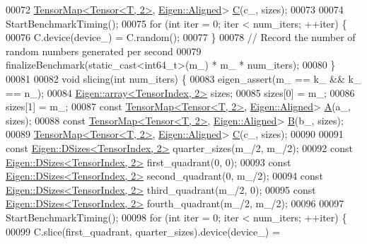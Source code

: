 \begin{DoxyCode}
00072     \hyperlink{class_eigen_1_1_tensor_map}{TensorMap<Tensor<T, 2>}, \hyperlink{group__enums_gga45fe06e29902b7a2773de05ba27b47a1ad37d4c71425bb286e9b4103830538fbf}{Eigen::Aligned}> 
      \hyperlink{group___core___module}{C}(c\_, sizes);
00073 
00074     StartBenchmarkTiming();
00075     \textcolor{keywordflow}{for} (\textcolor{keywordtype}{int} iter = 0; iter < num\_iters; ++iter) \{
00076       C.device(device\_) = C.random();
00077     \}
00078     \textcolor{comment}{// Record the number of random numbers generated per second}
00079     finalizeBenchmark(static\_cast<int64\_t>(m\_) * m\_ * num\_iters);
00080   \}
00081 
00082   \textcolor{keywordtype}{void} slicing(\textcolor{keywordtype}{int} num\_iters) \{
00083     eigen\_assert(m\_ == k\_ && k\_ == n\_);
00084     \hyperlink{class_eigen_1_1array}{Eigen::array<TensorIndex, 2>} sizes;
00085     sizes[0] = m\_;
00086     sizes[1] = m\_;
00087     \textcolor{keyword}{const} \hyperlink{class_eigen_1_1_tensor_map}{TensorMap<Tensor<T, 2>}, \hyperlink{group__enums_gga45fe06e29902b7a2773de05ba27b47a1ad37d4c71425bb286e9b4103830538fbf}{Eigen::Aligned}> 
      \hyperlink{group___core___module_class_eigen_1_1_matrix}{A}(a\_, sizes);
00088     \textcolor{keyword}{const} \hyperlink{class_eigen_1_1_tensor_map}{TensorMap<Tensor<T, 2>}, \hyperlink{group__enums_gga45fe06e29902b7a2773de05ba27b47a1ad37d4c71425bb286e9b4103830538fbf}{Eigen::Aligned}> 
      \hyperlink{group___core___module_class_eigen_1_1_matrix}{B}(b\_, sizes);
00089     \hyperlink{class_eigen_1_1_tensor_map}{TensorMap<Tensor<T, 2>}, \hyperlink{group__enums_gga45fe06e29902b7a2773de05ba27b47a1ad37d4c71425bb286e9b4103830538fbf}{Eigen::Aligned}> 
      \hyperlink{group___core___module}{C}(c\_, sizes);
00090 
00091     \textcolor{keyword}{const} \hyperlink{struct_eigen_1_1_d_sizes}{Eigen::DSizes<TensorIndex, 2>} quarter\_sizes(m\_/2, m\_/2);
00092     \textcolor{keyword}{const} \hyperlink{struct_eigen_1_1_d_sizes}{Eigen::DSizes<TensorIndex, 2>} first\_quadrant(0, 0);
00093     \textcolor{keyword}{const} \hyperlink{struct_eigen_1_1_d_sizes}{Eigen::DSizes<TensorIndex, 2>} second\_quadrant(0, m\_/2);
00094     \textcolor{keyword}{const} \hyperlink{struct_eigen_1_1_d_sizes}{Eigen::DSizes<TensorIndex, 2>} third\_quadrant(m\_/2, 0);
00095     \textcolor{keyword}{const} \hyperlink{struct_eigen_1_1_d_sizes}{Eigen::DSizes<TensorIndex, 2>} fourth\_quadrant(m\_/2, m\_/2);
00096 
00097     StartBenchmarkTiming();
00098     \textcolor{keywordflow}{for} (\textcolor{keywordtype}{int} iter = 0; iter < num\_iters; ++iter) \{
00099       C.slice(first\_quadrant, quarter\_sizes).device(device\_) =

\end{DoxyCode}

